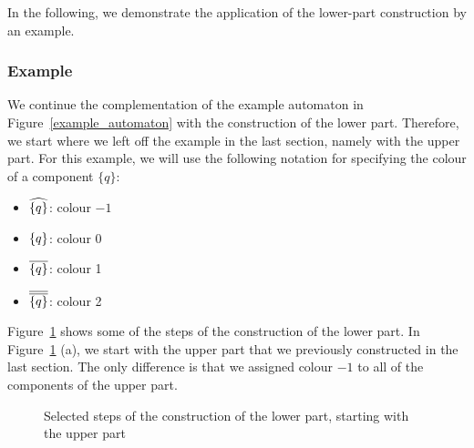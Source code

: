 In the following, we demonstrate the application of the lower-part construction by an example.


\subsubsection{Example}
We continue the complementation of the example automaton in Figure~\ref{example_automaton} with the construction of the lower part. Therefore, we start where we left off the example in the last section, namely with the upper part. For this example, we will use the following notation for specifying the colour of a component $\{q\}$:
\begin{itemize}
\item $\cl^{\{q\}}$: colour $-1$
\item $\cl0{\{q\}}$: colour 0   %
\item $\cl1{\{q\}}$: colour 1   %
\item $\cl2{\{q\}}$: colour 2
\end{itemize}

Figure~\ref{steps_lower} shows some of the steps of the construction of the lower part. In Figure~\ref{steps_lower} (a), we start with the upper part that we previously constructed in the last section. The only difference is that we assigned colour $-1$ to all of the components of the upper part.

\begin{figure}[htb]
\centering
  \begin{subfigure}[t]{0.49\textwidth}
  \centering
  \ComplementA
  \caption{}
  \end{subfigure}
  \hfill
  \begin{subfigure}[t]{0.49\textwidth}
  \centering
  \ComplementB
  \caption{}
  \end{subfigure}

  \begin{subfigure}[t]{0.49\textwidth}
  \centering
  \ComplementC
  \caption{}
  \end{subfigure}
  \hfill
  \begin{subfigure}[t]{0.49\textwidth}
  \centering
  \ComplementD
  \caption{}
  \end{subfigure}
\caption{Selected steps of the construction of the lower part, starting with the upper part }
\label{steps_lower}
\end{figure}

